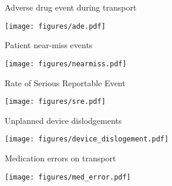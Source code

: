 \documentclass[ignorenonframetext,]{beamer}
\makeatletter
\def\maxwidth{\ifdim\Gin@nat@width>\linewidth\linewidth\else\Gin@nat@width\fi}
\def\maxheight{\ifdim\Gin@nat@height>\textheight0.8\textheight\else\Gin@nat@height\fi}
\renewcommand{\includegraphics}[2][]{%
    \Oldincludegraphics[#1,width=\maxwidth,height=\maxheight,keepaspectratio]{#2}}
\makeatother
\begin{document}
\begin{frame}{Adverse drug event during transport}

\texttt{[image: figures/ade.pdf]}

\end{frame}

\begin{frame}{Patient near-miss events}

\texttt{[image: figures/nearmiss.pdf]}

\end{frame}

\begin{frame}{Rate of Serious Reportable Event}

\texttt{[image: figures/sre.pdf]}

\end{frame}

\begin{frame}{Unplanned device dislodgements}

\texttt{[image: figures/device\_dislogement.pdf]}

\end{frame}

\begin{frame}{Medication errors on transport}

\texttt{[image: figures/med\_error.pdf]}

\end{frame}
\end{document}
